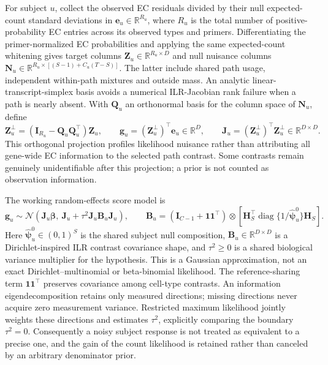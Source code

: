 \documentclass[11pt]{article}
\begin{document}
For subject \(u\), collect the observed EC residuals divided by their null expected-count standard deviations in \(\mathbf e_u\in\mathbb R^{R_u}\), where \(R_u\) is the total number of positive-probability EC entries across its observed types and primers. Differentiating the primer-normalized EC probabilities and applying the same expected-count whitening gives target columns \(\mathbf Z_u\in\mathbb R^{R_u\times D}\) and null nuisance columns \(\mathbf N_u\in\mathbb R^{R_u\times[(S-1)+C_u(T-S)]}\). The latter include shared path usage, independent within-path mixtures and outside mass. An analytic linear-transcript-simplex basis avoids a numerical ILR-Jacobian rank failure when a path is nearly absent. With \(\mathbf Q_u\) an orthonormal basis for the column space of \(\mathbf N_u\), define \begin{equation}\mathbf Z_u^\perp=(\mathbf I_{R_u}-\mathbf Q_u\mathbf Q_u^\top)\mathbf Z_u,\qquad \mathbf g_u=(\mathbf Z_u^\perp)^\top\mathbf e_u\in\mathbb R^D,\qquad \mathbf J_u=(\mathbf Z_u^\perp)^\top\mathbf Z_u^\perp\in\mathbb R^{D\times D}.\end{equation} This orthogonal projection profiles likelihood nuisance rather than attributing all gene-wide EC information to the selected path contrast. Some contrasts remain genuinely unidentifiable after this projection; a prior is not counted as observation information.

The working random-effects score model is \begin{equation}\mathbf g_u\sim\mathcal N\!\left(\mathbf J_u\boldsymbol\beta,\ \mathbf J_u+\tau^2\mathbf J_u\mathbf B_u\mathbf J_u\right),\qquad \mathbf B_u=(\mathbf I_{C-1}+\mathbf1\mathbf1^\top)\otimes\left[\mathbf H_S^\top\operatorname{diag}\{1/\widehat{\boldsymbol\psi}_u^0\}\mathbf H_S\right].\end{equation} Here \(\widehat{\boldsymbol\psi}_u^0\in(0,1)^S\) is the shared subject null composition, \(\mathbf B_u\in\mathbb R^{D\times D}\) is a Dirichlet-inspired ILR contrast covariance shape, and \(\tau^2\ge0\) is a shared biological variance multiplier for the hypothesis. This is a Gaussian approximation, not an exact Dirichlet--multinomial or beta-binomial likelihood. The reference-sharing term \(\mathbf1\mathbf1^\top\) preserves covariance among cell-type contrasts. An information eigendecomposition retains only measured directions; missing directions never acquire zero measurement variance. Restricted maximum likelihood jointly weights these directions and estimates \(\tau^2\), explicitly comparing the boundary \(\tau^2=0\). Consequently a noisy subject response is not treated as equivalent to a precise one, and the gain of the count likelihood is retained rather than canceled by an arbitrary denominator prior.
\end{document}

